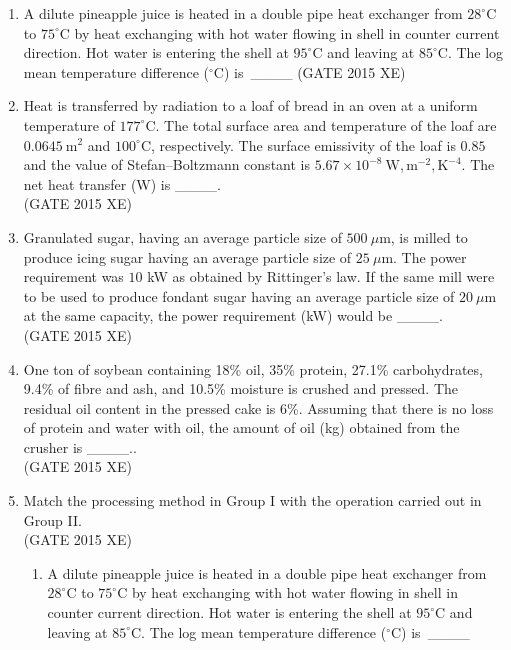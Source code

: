 \documentclass[journal,12pt,onecolumn]{IEEEtran}
\begin{document}
\begin{enumerate}
\begin{enumerate}
\begin{enumerate}
\item A dilute pineapple juice is heated in a double pipe heat exchanger from $28^\circ$C to $75^\circ$C by heat exchanging with hot water flowing in shell in counter current direction. Hot water is entering the shell at $95^\circ$C and leaving at $85^\circ$C. The log mean temperature difference ($^\circ$C) is\ \_\_\_\_
\hfill{(GATE 2015 XE)} \\


\item Heat is transferred by radiation to a loaf of bread in an oven at a uniform temperature of $177^\circ$C. The total surface area and temperature of the loaf are $0.0645\ \mathrm{m^2}$ and $100^\circ$C, respectively. The surface emissivity of the loaf is $0.85$ and the value of Stefan–Boltzmann constant is $5.67\times 10^{-8}\ \mathrm{W,m^{-2},K^{-4}}$. The net heat transfer (W) is \_\_\_\_.\\
\hfill{(GATE 2015 XE)} 


\item Granulated sugar, having an average particle size of $500\ \mu$m, is milled to produce icing sugar having an average particle size of $25\ \mu$m. The power requirement was $10$ kW as obtained by Rittinger’s law. If the same mill were to be used to produce fondant sugar having an average particle size of $20\ \mu$m at the same capacity, the power requirement (kW) would be \_\_\_\_.\\
\hfill{(GATE 2015 XE)} 

\item One ton of soybean containing 18\% oil, 35\% protein, 27.1\% carbohydrates, 9.4\% of fibre and ash, and 10.5\% moisture is crushed and pressed. The residual oil content in the pressed cake is 6\%. Assuming that there is no loss of protein and water with oil, the amount of oil (kg) obtained from the crusher is \_\_\_\_.. \\
\hfill{(GATE 2015 XE)} \\


\item Match the processing method in Group I with the operation carried out in Group II.\\



\hfill{(GATE 2015 XE)} 
\begin{multicols}{2}
\begin{enumerate}
=======

\newpage

\item A dilute pineapple juice is heated in a double pipe heat exchanger from $28^\circ$C to $75^\circ$C by heat exchanging with hot water flowing in shell in counter current direction. Hot water is entering the shell at $95^\circ$C and leaving at $85^\circ$C. The log mean temperature difference ($^\circ$C) is\ \_\_\_\_
\hfill{} \\


\end{enumerate}
\end{multicols}
\end{enumerate}
\end{enumerate}
\end{enumerate}
\end{document}

